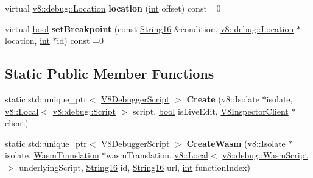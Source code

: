 \begin{DoxyCompactItemize}
\mbox{\label{classv8__inspector_1_1V8DebuggerScript_ae5ea6e42bbc7321f65c96a13963f9f91}} 
virtual \mbox{\hyperlink{classv8_1_1debug_1_1Location}{v8\+::debug\+::\+Location}} {\bfseries location} (\mbox{\hyperlink{classint}{int}} offset) const =0
\item 
\mbox{\label{classv8__inspector_1_1V8DebuggerScript_a3ae4423e0cb79324d9ef1d65db8e83be}} 
virtual \mbox{\hyperlink{classbool}{bool}} {\bfseries set\+Breakpoint} (const \mbox{\hyperlink{classv8__inspector_1_1String16}{String16}} \&condition, \mbox{\hyperlink{classv8_1_1debug_1_1Location}{v8\+::debug\+::\+Location}} $\ast$location, \mbox{\hyperlink{classint}{int}} $\ast$id) const =0
\end{DoxyCompactItemize}
\subsection*{Static Public Member Functions}
\begin{DoxyCompactItemize}
\item 
\mbox{\label{classv8__inspector_1_1V8DebuggerScript_a394e25831ac20cbc746ab94f889ec4cd}} 
static std\+::unique\+\_\+ptr$<$ \mbox{\hyperlink{classv8__inspector_1_1V8DebuggerScript}{V8\+Debugger\+Script}} $>$ {\bfseries Create} (v8\+::\+Isolate $\ast$isolate, \mbox{\hyperlink{classv8_1_1Local}{v8\+::\+Local}}$<$ \mbox{\hyperlink{classv8_1_1debug_1_1Script}{v8\+::debug\+::\+Script}} $>$ script, \mbox{\hyperlink{classbool}{bool}} is\+Live\+Edit, \mbox{\hyperlink{classv8__inspector_1_1V8InspectorClient}{V8\+Inspector\+Client}} $\ast$client)
\item 
\mbox{\label{classv8__inspector_1_1V8DebuggerScript_a6b2b6efd63eea94f65aeb68b6887414c}} 
static std\+::unique\+\_\+ptr$<$ \mbox{\hyperlink{classv8__inspector_1_1V8DebuggerScript}{V8\+Debugger\+Script}} $>$ {\bfseries Create\+Wasm} (v8\+::\+Isolate $\ast$isolate, \mbox{\hyperlink{classv8__inspector_1_1WasmTranslation}{Wasm\+Translation}} $\ast$wasm\+Translation, \mbox{\hyperlink{classv8_1_1Local}{v8\+::\+Local}}$<$ \mbox{\hyperlink{classv8_1_1debug_1_1WasmScript}{v8\+::debug\+::\+Wasm\+Script}} $>$ underlying\+Script, \mbox{\hyperlink{classv8__inspector_1_1String16}{String16}} id, \mbox{\hyperlink{classv8__inspector_1_1String16}{String16}} url, \mbox{\hyperlink{classint}{int}} function\+Index)
\end{DoxyCompactItemize}
